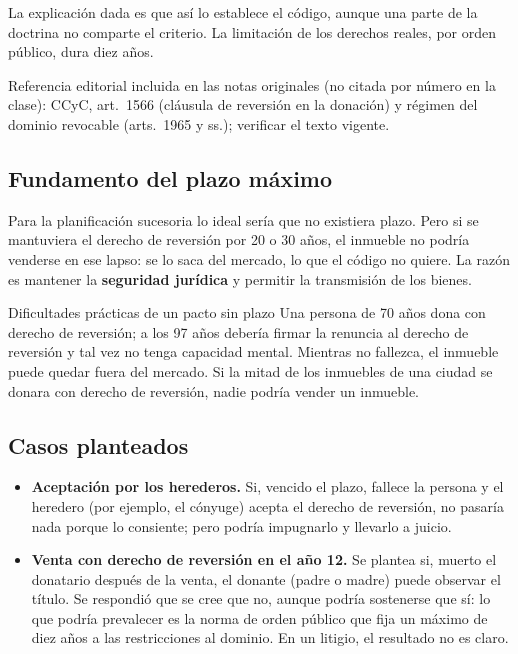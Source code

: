 \documentclass[12pt,oneside]{book}
\begin{document}
La explicación dada es que así lo establece el código, aunque una parte de la doctrina no comparte el criterio. La limitación de los derechos reales, por orden público, dura diez años.

\begin{note}
Referencia editorial incluida en las notas originales (no citada por número en la clase): CCyC, art.~1566 (cláusula de reversión en la donación) y régimen del dominio revocable (arts.~1965 y ss.); verificar el texto vigente.
\end{note}

\subsection{Fundamento del plazo máximo}

Para la planificación sucesoria lo ideal sería que no existiera plazo. Pero si se mantuviera el derecho de reversión por 20 o 30 años, el inmueble no podría venderse en ese lapso: se lo saca del mercado, lo que el código no quiere. La razón es mantener la \textbf{seguridad jurídica} y permitir la transmisión de los bienes.

\begin{example}{Dificultades prácticas de un pacto sin plazo}
Una persona de 70 años dona con derecho de reversión; a los 97 años debería firmar la renuncia al derecho de reversión y tal vez no tenga capacidad mental. Mientras no fallezca, el inmueble puede quedar fuera del mercado. Si la mitad de los inmuebles de una ciudad se donara con derecho de reversión, nadie podría vender un inmueble.
\end{example}

\subsection{Casos planteados}

\begin{itemize}
    \item \textbf{Aceptación por los herederos.} Si, vencido el plazo, fallece la persona y el heredero (por ejemplo, el cónyuge) acepta el derecho de reversión, no pasaría nada porque lo consiente; pero podría impugnarlo y llevarlo a juicio.
    \item \textbf{Venta con derecho de reversión en el año 12.} Se plantea si, muerto el donatario después de la venta, el donante (padre o madre) puede observar el título. Se respondió que se cree que no, aunque podría sostenerse que sí: lo que podría prevalecer es la norma de orden público que fija un máximo de diez años a las restricciones al dominio. En un litigio, el resultado no es claro.
\end{itemize}
\end{document}
